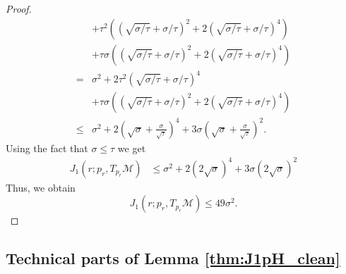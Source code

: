 \documentclass[12pt]{article}
\theoremstyle{remark}
\newcommand{\MM}{\mathcal{M}}
\begin{document}
\begin{appendices}
\begin{proof}
\begin{align*}
		& + \tau^2  ((\sqrt{\sigma/\tau}+\sigma/\tau)^2  +2(\sqrt{\sigma/\tau}+\sigma/\tau)^4) \\& + \tau\sigma  ((\sqrt{\sigma/\tau}+\sigma/\tau)^2+2(\sqrt{\sigma/\tau}+\sigma/\tau)^4) \\
		= &
		\sigma^2 + 2\tau^2 (\sqrt{\sigma/\tau}+\sigma/\tau)^4\\& + \tau\sigma ( (\sqrt{\sigma/\tau}+\sigma/\tau)^2 +2(\sqrt{\sigma/\tau}+\sigma/\tau)^4)\\
		\leq &
		\sigma^2 + 2 \left(\sqrt{\sigma} + \frac{\sigma}{\sqrt{\tau}}\right)^4
		+ 3\sigma
		\left(\sqrt{\sigma} + \frac{\sigma}{\sqrt{\tau}}\right)^2 %
	.\end{align*}
Using the fact that $ \sigma \leq \tau $ we get
\begin{align*}
J_1(r; {p_r}, T_{{p_r}}\MM) &\leq
\sigma^2 + 2(2\sqrt{\sigma})^4 + 3\sigma (2\sqrt{\sigma})^2
\end{align*}
Thus, we obtain
$$J_1(r; {p_r}, T_{{p_r}}\MM) \leq 49 \sigma^2.$$
\end{proof}
\subsection{Technical parts of Lemma \ref{thm:J1pH_clean}}

\end{appendices}
\end{document}
